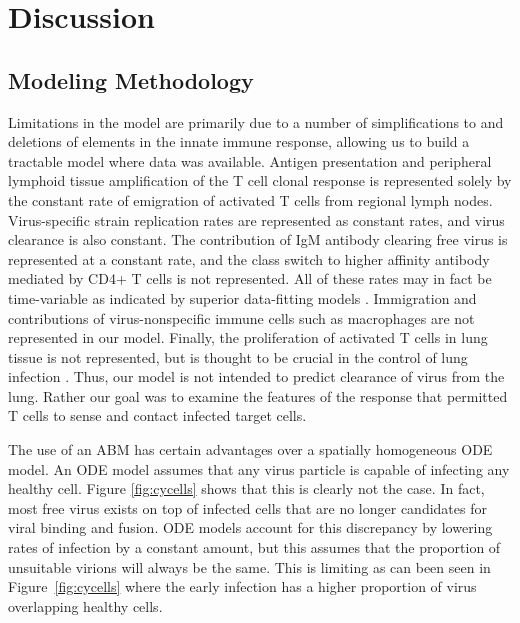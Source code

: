 \documentclass[10pt]{article}
\begin{document}
\section*{Discussion}



\subsection*{Modeling Methodology}

Limitations in the model are primarily due to a number of simplifications to and deletions of elements in the innate immune response, allowing us to build a tractable model where data was available.  Antigen presentation and peripheral lymphoid tissue amplification of the T cell clonal response is represented solely by the constant rate of emigration of activated T cells from regional lymph nodes.  Virus-specific strain replication rates are represented as constant rates, and virus clearance is also constant.  The contribution of IgM antibody clearing free virus is represented at a constant rate, and the class switch to higher affinity antibody mediated by CD4+ T cells is not represented.  All of these rates may in fact be time-variable as indicated by superior data-fitting models \cite{Wu2011}.  Immigration and contributions of virus-nonspecific immune cells such as macrophages are not represented in our model.  Finally, the proliferation of activated T cells in lung tissue is not represented, but is thought to be crucial in the control of lung infection \cite{Miao2010}.  Thus, our model is not intended to predict clearance of virus from the lung.  Rather our goal was to examine the features of the response that permitted T cells to sense and contact infected target cells.

The use of an ABM has certain advantages over a spatially homogeneous ODE model.  An ODE model assumes that any virus particle is capable of infecting any healthy cell.  Figure \ref{fig:cycells} shows that this is clearly not the case.  In fact, most free virus exists on top of infected cells that are no longer candidates for viral binding and fusion.  ODE models account for this discrepancy by lowering rates of infection by a constant amount, but this assumes that the proportion of unsuitable virions will always be the same.  This is limiting as can been seen in Figure~\ref{fig:cycells} where the early infection has a higher proportion of virus overlapping healthy cells.
\end{document}
